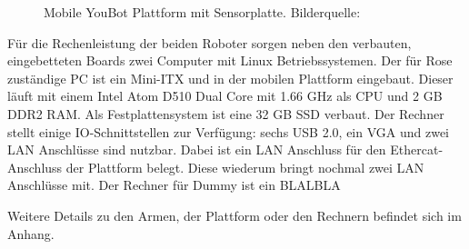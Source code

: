  \begin{figure}[H]
 	\centering
 	\caption{Mobile YouBot Plattform mit Sensorplatte. Bilderquelle:\cite{kuka2015}}
 	\label{fig:basic-aufbau-youbot-base-full}
 \end{figure}

Für die Rechenleistung der beiden Roboter sorgen neben den verbauten, eingebetteten Boards zwei Computer mit Linux Betriebssystemen.
Der für Rose zuständige PC ist ein Mini-ITX und in der mobilen Plattform eingebaut. Dieser läuft mit einem Intel Atom D510 Dual Core mit 1.66 GHz als CPU und 2 GB DDR2 RAM. Als Festplattensystem ist eine 32 GB SSD verbaut. Der Rechner stellt einige IO-Schnittstellen zur Verfügung: sechs USB 2.0, ein VGA und zwei LAN Anschlüsse sind nutzbar. Dabei ist ein LAN Anschluss für den Ethercat-Anschluss der Plattform belegt. Diese wiederum bringt nochmal zwei LAN Anschlüsse mit. Der Rechner für Dummy ist ein BLALBLA %

Weitere Details zu den Armen, der Plattform oder den Rechnern befindet sich im Anhang.%

